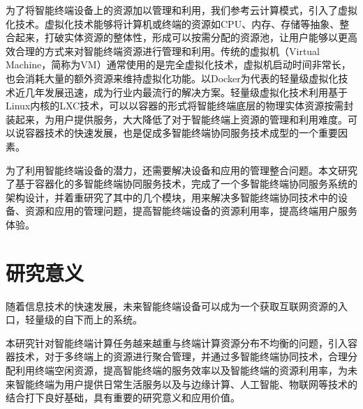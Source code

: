 为了将智能终端设备上的资源加以管理和利用，我们参考云计算模式，引入了虚拟化技术。虚拟化技术能够将计算机或终端的资源如CPU、内存、存储等抽象、整合起来，打破实体资源的整体性，形成可以按需分配的资源池，让用户能够以更高效合理的方式来对智能终端资源进行管理和利用。传统的虚拟机（Virtual Machine，简称为VM）通常使用的是完全虚拟化技术，虚拟机启动时间非常长，也会消耗大量的额外资源来维持虚拟化功能。以Docker为代表的轻量级虚拟化技术近几年发展迅速，成为行业内最流行的解决方案。轻量级虚拟化技术利用基于Linux内核的LXC技术，可以以容器的形式将智能终端底层的物理实体资源按需封装起来，为用户提供服务，大大降低了对于智能终端上资源的管理和利用难度。可以说容器技术的快速发展，也是促成多智能终端协同服务技术成型的一个重要因素。

为了利用智能终端设备的潜力，还需要解决设备和应用的管理整合问题。本文研究了基于容器化的多智能终端协同服务技术，完成了一个多智能终端协同服务系统的架构设计，并着重研究了其中的几个模块，用来解决多智能终端协同技术中的设备、资源和应用的管理问题，提高智能终端设备的资源利用率，提高终端用户服务体验。



\section{研究意义}

随着信息技术的快速发展，未来智能终端设备可以成为一个获取互联网资源的入口，轻量级的自下而上的系统。

本研究针对智能终端计算任务越来越重与终端计算资源分布不均衡的问题，引入容器技术，对于多终端上的资源进行聚合管理，并通过多智能终端协同技术，合理分配利用终端空闲资源，提高智能终端的服务效率以及智能终端的资源利用率，为未来智能终端为用户提供日常生活服务以及与边缘计算、人工智能、物联网等技术的结合打下良好基础，具有重要的研究意义和应用价值。




